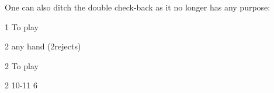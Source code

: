 \documentclass[12pt, a4paper]{article}
\begin{document}
One can also ditch the double check-back as it no longer has any purpose:
\sequence{{1\diams}{1\hearts}{1\spades}}
\begin{options}[2]
    \item[1\nt] To play
    \item[2\clubs] \invp any hand (2\diams rejects)
    \item[2\diams] To play  
    \item[2\hearts] 10-11 6\hearts 
\end{options} 
\end{document}
